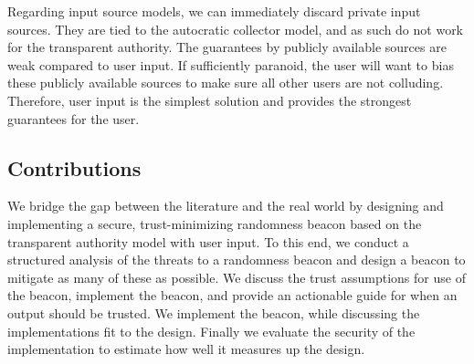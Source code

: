 Regarding input source models, we can immediately discard private input sources. They are tied to the autocratic collector model, and as such do not work for the transparent authority. The guarantees by publicly available sources are weak compared to user input. If sufficiently paranoid, the user will want to bias these publicly available sources to make sure all other users are not colluding. Therefore, user input is the simplest solution and provides the strongest guarantees for the user.

\subsection{Contributions}
We bridge the gap between the literature and the real world by designing and implementing a secure, trust-minimizing randomness beacon based on the transparent authority model with user input. To this end, we conduct a structured analysis of the threats to a randomness beacon and design a beacon to mitigate as many of these as possible. We discuss the trust assumptions for use of the beacon, implement the beacon, and provide an actionable guide for when an output should be trusted. We implement the beacon, while discussing the implementations fit to the design. Finally we evaluate the security of the implementation to estimate how well it measures up the design.
